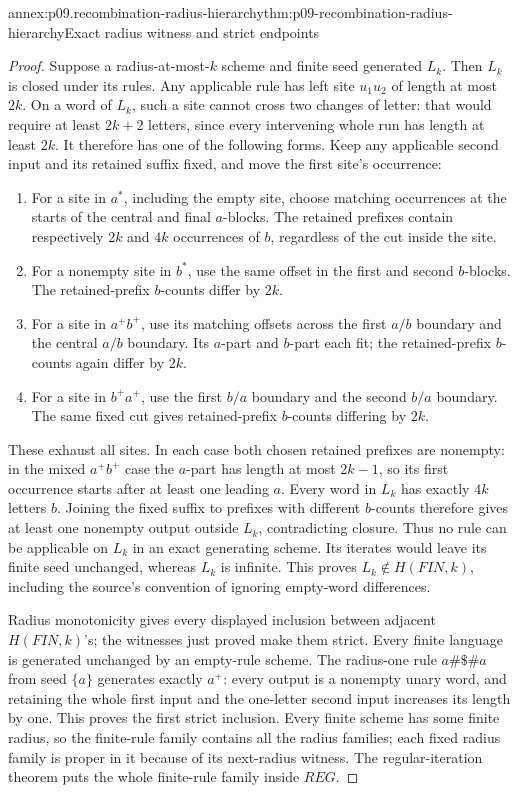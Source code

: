 \begin{annexitem}{annex:p09.recombination-radius-hierarchy}{thm:p09-recombination-radius-hierarchy}{Exact radius witness and strict endpoints}
\begin{proof}
Suppose a radius-at-most-\(k\) scheme and finite seed generated \(L_k\).
Then \(L_k\) is closed under its rules. Any applicable rule has left site
\(u_1u_2\) of length at most \(2k\). On a word of \(L_k\), such a site
cannot cross two changes of letter: that would require at least
\(2k+2\) letters, since every intervening whole run has length at least \(2k\).
It therefore has one of the following forms. Keep any applicable second
input and its retained suffix fixed, and move the first site's occurrence:
\begin{enumerate}
\item For a site in \(a^*\), including the empty site, choose matching
      occurrences at the starts of the central and final \(a\)-blocks.
      The retained prefixes contain respectively \(2k\) and \(4k\)
      occurrences of \(b\), regardless of the cut inside the site.
\item For a nonempty site in \(b^*\), use the same offset in the first
      and second \(b\)-blocks. The retained-prefix \(b\)-counts differ by \(2k\).
\item For a site in \(a^+b^+\), use its matching offsets across the
      first \(a/b\) boundary and the central \(a/b\) boundary.
      Its \(a\)-part and \(b\)-part each fit; the retained-prefix
      \(b\)-counts again differ by \(2k\).
\item For a site in \(b^+a^+\), use the first \(b/a\) boundary and
      the second \(b/a\) boundary. The same fixed cut gives
      retained-prefix \(b\)-counts differing by \(2k\).
\end{enumerate}
These exhaust all sites. In each case both chosen retained prefixes are
nonempty: in the mixed \(a^+b^+\) case the \(a\)-part has length at most
\(2k-1\), so its first occurrence starts after at least one leading \(a\).
Every word in \(L_k\) has exactly \(4k\) letters \(b\).
Joining the fixed suffix to prefixes with different \(b\)-counts therefore
gives at least one nonempty output outside \(L_k\), contradicting closure.
Thus no rule can be applicable on \(L_k\) in an exact generating scheme.
Its iterates would leave its finite seed unchanged, whereas \(L_k\) is infinite.
This proves \(L_k\notin H(FIN,k)\), including the source's convention
of ignoring empty-word differences.

Radius monotonicity gives every displayed inclusion between adjacent
\(H(FIN,k)\)'s; the witnesses just proved make them strict.
Every finite language is generated unchanged by an empty-rule scheme.
The radius-one rule \(a\#\$\#a\) from seed \(\{a\}\) generates exactly
\(a^+\): every output is a nonempty unary word, and retaining the whole
first input and the one-letter second input increases its length by one.
This proves the first strict inclusion.
Every finite scheme has some finite radius, so the finite-rule family
contains all the radius families; each fixed radius family is proper in
it because of its next-radius witness. The regular-iteration theorem
puts the whole finite-rule family inside \(REG\).


\end{proof}
\end{annexitem}

